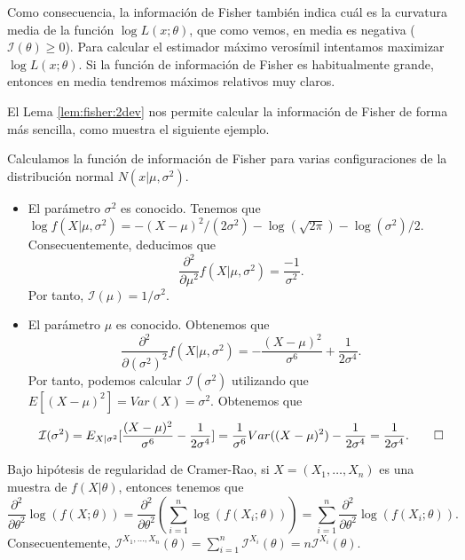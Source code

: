 \documentclass{article}
\begin{document}
    Como consecuencia, la información de Fisher también indica cuál es la curvatura media de la función $\log L(x; \theta)$, que como vemos, en media es negativa ($\mathcal{I}(\theta) \ge 0$). Para calcular el estimador máximo verosímil intentamos maximizar $\log L(x; \theta)$. Si la función de información de Fisher es habitualmente grande, entonces en media tendremos máximos relativos muy claros.

    El Lema \ref{lem:fisher:2dev} nos permite calcular la información de Fisher de forma más sencilla, como muestra el siguiente ejemplo.

    \begin{ex}
        Calculamos la función de información de Fisher para varias configuraciones de la distribución normal $N(x|\mu, \sigma^2)$.
        \begin{itemize}
            \item El parámetro $\sigma^2$ es conocido. Tenemos que $\log f(X|\mu, \sigma^2) = - (X-\mu)^2 / (2\sigma^2) - \log(\sqrt{2\pi}) - \log(\sigma^2)/2$. Consecuentemente, deducimos que \[\frac{\partial^2}{\partial\mu^2} f(X|\mu,\sigma^2) = \frac{-1}{\sigma^2}.\]
            Por tanto, $\mathcal{I}(\mu) = 1 / \sigma^2$.
            \item El parámetro $\mu$ es conocido. Obtenemos que
            \[\frac{\partial^2}{\partial(\sigma^2)^2} f(X|\mu,\sigma^2) = -\frac{(X-\mu)^2}{\sigma^6} + \frac{1}{2\sigma^4}.\]
            Por tanto, podemos calcular $\mathcal{I}(\sigma^2)$ utilizando que $E[(X-\mu)^2] = Var(X) = \sigma^2$. Obtenemos que
            \[\mathcal{I}(\sigma^2) = E_{X|\sigma^2}[\frac{(X-\mu)^2}{\sigma^6} - \frac{1}{2\sigma^4}] = \frac{1}{\sigma^6} Var((X-\mu)^2) - \frac{1}{2\sigma^4} = \frac{1}{2\sigma^4}. \qedhere\]
        \end{itemize}
    \end{ex}

    \begin{remark}
        Bajo hipótesis de regularidad de Cramer-Rao, si $X=(X_1, \ldots, X_n)$ es una muestra de $f(X|\theta)$, entonces tenemos que
        \[\frac{\partial^2}{\partial \theta^2}\log(f(X;\theta)) = \frac{\partial^2}{\partial \theta^2} \left(\sum_{i = 1}^n \log(f(X_i;\theta))\right) = \sum_{i = 1}^n \frac{\partial^2}{\partial \theta^2}\log(f(X_i;\theta)).\]
        Consecuentemente, $\mathcal{I}^{X_1, \ldots, X_n}(\theta) = \sum_{i = 1}^n \mathcal{I}^{X_i}(\theta) = n \mathcal{I}^{X_i}(\theta)$.
    \end{remark}
\end{document}

